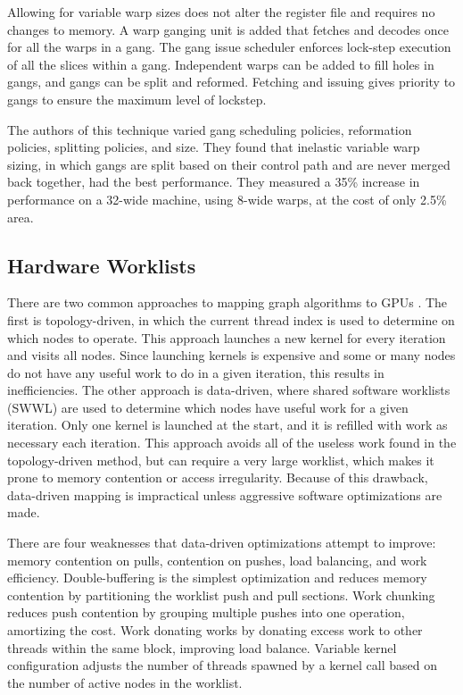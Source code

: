 \documentclass[prodmode,acmtecs]{acmsmall} %
\begin{document}
Allowing for variable warp sizes does not alter the register file and requires
no changes to memory. A warp ganging unit is added that fetches and decodes once
for all the warps in a gang. The gang issue scheduler enforces lock-step
execution of all the slices within a gang. Independent warps can be added to
fill holes in gangs, and gangs can be split and reformed. Fetching and issuing
gives priority to gangs to ensure the maximum level of lockstep.

The authors of this technique varied gang scheduling policies, reformation
policies, splitting policies, and size. They found that inelastic variable warp
sizing, in which gangs are split based on their control path and are never
merged back together, had the best performance. They measured a 35\% increase in
performance on a 32-wide machine, using 8-wide warps, at the cost of only 2.5\%
area.

\subsection{Hardware Worklists}
There are two common approaches to mapping graph algorithms to GPUs
\cite{UsingFineGrainHardwareWorklists}. The first is topology-driven, in which
the current thread index is used to determine on which nodes to operate. This
approach launches a new kernel for every iteration and visits all nodes. Since
launching kernels is expensive and some or many nodes do not have any useful
work to do in a given iteration, this results in inefficiencies. The other
approach is data-driven, where shared software worklists (SWWL) are used to
determine which nodes have useful work for a given iteration. Only one kernel is
launched at the start, and it is refilled with work as necessary each iteration.
This approach avoids all of the useless work found in the topology-driven
method, but can require a very large worklist, which makes it prone to memory
contention or access irregularity. Because of this drawback, data-driven mapping
is impractical unless aggressive software optimizations are made.

There are four weaknesses that data-driven optimizations attempt to improve:
memory contention on pulls, contention on pushes, load balancing, and work
efficiency. Double-buffering is the simplest optimization and reduces memory
contention by partitioning the worklist push and pull sections. Work chunking
reduces push contention by grouping multiple pushes into one operation,
amortizing the cost. Work donating works by donating excess work to other
threads within the same block, improving load balance. Variable kernel
configuration adjusts the number of threads spawned by a kernel call based on
the number of active nodes in the worklist.
\end{document}
